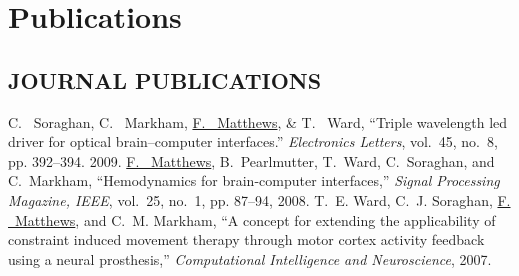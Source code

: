 \section{Publications}

\subsection{\small{JOURNAL PUBLICATIONS}}
{C. ~Soraghan, C. ~Markham, \underline{F. ~Matthews},  \&  T. ~Ward,
  ``Triple wavelength led driver for optical brain--computer interfaces.'' \emph{
  Electronics Letters\/}, vol.~45, no.~8, pp. 392--394. 2009.}
\linebreak
\linebreak
\underline{F. ~Matthews}, B.~Pearlmutter, T.~Ward, C.~Soraghan, and C.~Markham,
  ``Hemodynamics for brain-computer interfaces,'' \emph{Signal Processing
  Magazine, IEEE}, vol.~25, no.~1, pp. 87--94, 2008.
\linebreak
\linebreak
T.~E. Ward, C.~J. Soraghan, \underline{F. ~Matthews}, and C.~M. Markham, ``A concept for
  extending the applicability of constraint induced movement therapy through
  motor cortex activity feedback using a neural prosthesis,''
  \emph{Computational Intelligence and Neuroscience}, 2007.

